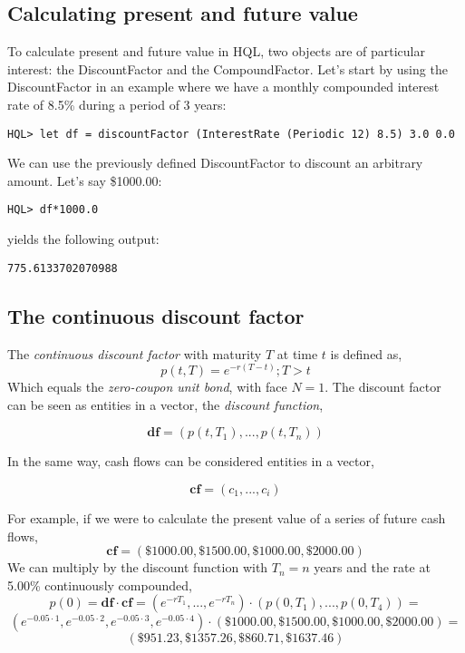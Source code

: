 \documentclass[11pt,a4paper]{article}
\numberwithin{equation}{section}
\begin{document}
\subsection{Calculating present and future value}


To calculate present and future value in HQL, two objects are of particular interest:
the DiscountFactor and the CompoundFactor. Let's start by using the DiscountFactor in an example
where we have a monthly compounded interest rate of 8.5\% during a period of 3 years:
\FrameSep
\begin{lstlisting}
HQL> let df = discountFactor (InterestRate (Periodic 12) 8.5) 3.0 0.0
\end{lstlisting}
We can use the previously defined DiscountFactor to discount an arbitrary amount. Let's say
\$1000.00:
\FrameSep
\begin{lstlisting}
HQL> df*1000.0
\end{lstlisting}
yields the following output:
\FrameSep
\begin{lstlisting}[style=Output]
775.6133702070988
\end{lstlisting}

\subsection{The continuous discount factor}
The \textit{continuous discount factor} with maturity $T$ at time $t$ is defined as,
\[
p(t,T)=e^{-r(T-t)}; T>t
\]
Which equals the \textit{zero-coupon unit bond}, with face $N=1$. The discount factor
can be seen as entities in a vector, the \textit{discount function},

\[
\mathbf{df} = (p(t,T_1), ..., p(t,T_n))
\]

In the same way, cash flows can be considered entities in a vector,

\[
\mathbf{cf} = (c_1, ..., c_i)
\]

For example, if we were to calculate the present value of a series of future cash flows,
\[
\mathbf{cf} = (\$1000.00,\$1500.00,\$1000.00,\$2000.00)
\]
We can multiply by the discount function with $T_n=n$ years and the rate at 5.00\% continuously compounded,
\[
p(0) = \mathbf{df}\cdot\mathbf{cf} = (e^{-rT_1},...,e^{-rT_n})\cdot(p(0,T_1), ...,p(0,T_4))=
\]
\[
(e^{-0.05\cdot1},e^{-0.05\cdot2},e^{-0.05\cdot3},e^{-0.05\cdot4}) \cdot (\$1000.00,\$1500.00,\$1000.00,\$2000.00)=
\]
\[
(\$951.23,\$1357.26,\$860.71,\$1637.46)
\]
\end{document}
